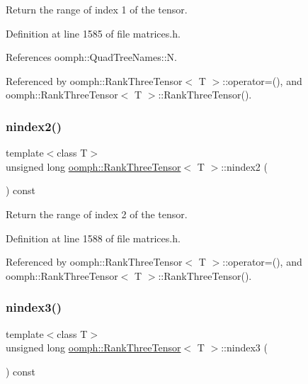 Return the range of index 1 of the tensor. 



Definition at line 1585 of file matrices.\+h.



References oomph\+::\+Quad\+Tree\+Names\+::N.



Referenced by oomph\+::\+Rank\+Three\+Tensor$<$ T $>$\+::operator=(), and oomph\+::\+Rank\+Three\+Tensor$<$ T $>$\+::\+Rank\+Three\+Tensor().

\mbox{\label{classoomph_1_1RankThreeTensor_a7934dad6cda9e9716c086cd15ee05dad}} 
\subsubsection{\texorpdfstring{nindex2()}{nindex2()}}
{\footnotesize\ttfamily template$<$class T$>$ \\
unsigned long \hyperlink{classoomph_1_1RankThreeTensor}{oomph\+::\+Rank\+Three\+Tensor}$<$ T $>$\+::nindex2 (\begin{DoxyParamCaption}{ }\end{DoxyParamCaption}) const\hspace{0.3cm}{\ttfamily [inline]}}



Return the range of index 2 of the tensor. 



Definition at line 1588 of file matrices.\+h.



Referenced by oomph\+::\+Rank\+Three\+Tensor$<$ T $>$\+::operator=(), and oomph\+::\+Rank\+Three\+Tensor$<$ T $>$\+::\+Rank\+Three\+Tensor().

\mbox{\label{classoomph_1_1RankThreeTensor_ac8c7eb798506698c0e231557af26310d}} 
\subsubsection{\texorpdfstring{nindex3()}{nindex3()}}
{\footnotesize\ttfamily template$<$class T$>$ \\
unsigned long \hyperlink{classoomph_1_1RankThreeTensor}{oomph\+::\+Rank\+Three\+Tensor}$<$ T $>$\+::nindex3 (\begin{DoxyParamCaption}{ }\end{DoxyParamCaption}) const\hspace{0.3cm}{\ttfamily [inline]}}



